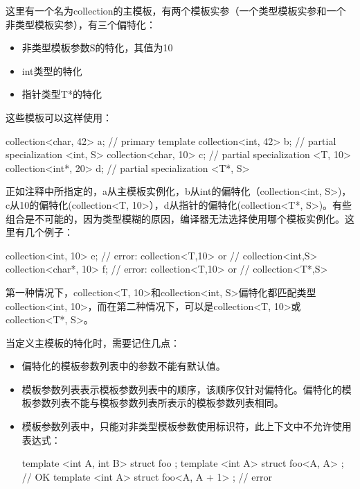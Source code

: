 这里有一个名为collection的主模板，有两个模板实参（一个类型模板实参和一个非类型模板实参），有三个偏特化：

\begin{itemize}
  \item 非类型模板参数S的特化，其值为10
  \item int类型的特化
  \item 指针类型T*的特化
\end{itemize}

这些模板可以这样使用：

\begin{cppcode}
collection<char, 42> a; // primary template
collection<int, 42> b; // partial specialization <int, S>
collection<char, 10> c; // partial specialization <T, 10>
collection<int*, 20> d; // partial specialization <T*, S>
\end{cppcode}

正如注释中所指定的，a从主模板实例化，b从int的偏特化（collection<int, S>)， c从10的偏特化(collection<T, 10>），d从指针的偏特化(collection<T*, S>)。有些组合是不可能的，因为类型模糊的原因，编译器无法选择使用哪个模板实例化。这里有几个例子：

\begin{cppcode}
collection<int, 10> e; // error: collection<T,10> or
                       // collection<int,S>
collection<char*, 10> f; // error: collection<T,10> or
                         // collection<T*,S>
\end{cppcode}

第一种情况下，collection<T, 10>和collection<int, S>偏特化都匹配类型collection<int, 10>，而在第二种情况下，可以是collection<T, 10>或collection<T*, S>。

当定义主模板的特化时，需要记住几点：

\begin{itemize}
  \item 偏特化的模板参数列表中的参数不能有默认值。
  \item 模板参数列表表示模板参数列表中的顺序，该顺序仅针对偏特化。偏特化的模板参数列表不能与模板参数列表所表示的模板参数列表相同。
  \item 模板参数列表中，只能对非类型模板参数使用标识符，此上下文中不允许使用表达式：
\begin{cppcode}
template <int A, int B> struct foo {};
template <int A> struct foo<A, A> {}; // OK
template <int A> struct foo<A, A + 1> {}; // error
\end{cppcode}
\end{itemize}


